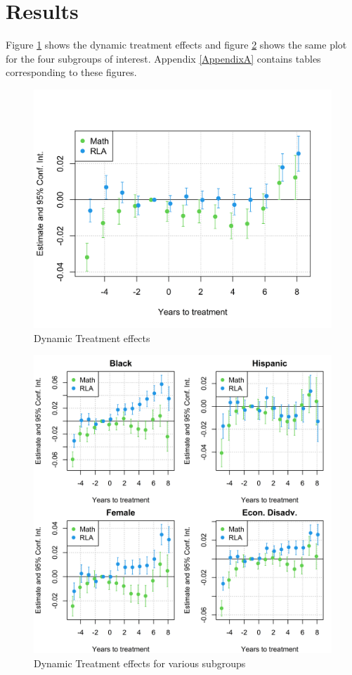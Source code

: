 \section{Results} \label{Results}

Figure \ref{ResultsPlot} shows the dynamic treatment effects and figure \ref{ResultsPlotSub} shows the same plot for the four subgroups of interest. Appendix \ref{AppendixA} contains tables corresponding to these figures.



\begin{figure}[!h]
	\centering
	\includegraphics[scale=1]{"../Code & Data/ResultsPlot.png"}
	\caption{Dynamic Treatment effects}
	\label{ResultsPlot}
\end{figure}

\begin{figure}[!h]
	\centering
	\includegraphics[scale=1]{"../Code & Data/ResultsPlotSub.png"}
	\caption{Dynamic Treatment effects for various subgroups}
	\label{ResultsPlotSub}
\end{figure}


